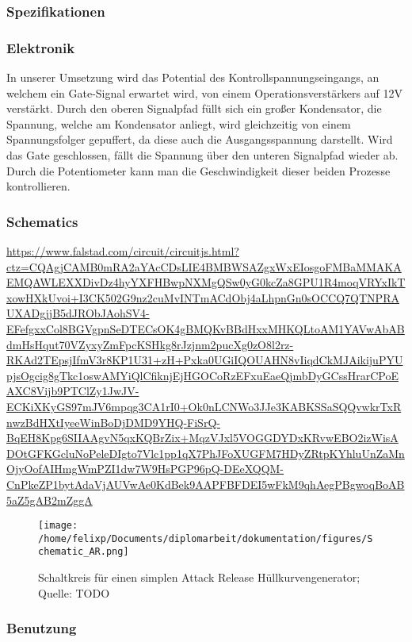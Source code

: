 \subsubsection{Spezifikationen}
\label{sec:orgc2427c2}
\subsubsection{Elektronik}
\label{sec:org35c4617}
In unserer Umsetzung wird das Potential des Kontrollspannungseingangs, an welchem ein Gate-Signal erwartet wird, von einem Operationsverstärkers auf 12V verstärkt. Durch den oberen Signalpfad füllt sich ein großer Kondensator, die Spannung, welche am Kondensator anliegt, wird gleichzeitig von einem Spannungsfolger gepuffert, da diese auch die Ausgangsspannung darstellt. Wird das Gate geschlossen, fällt die Spannung über den unteren Signalpfad wieder ab. Durch die Potentiometer kann man die Geschwindigkeit dieser beiden Prozesse kontrollieren.
\subsubsection{Schematics}
\label{sec:org4790a9a}
\url{https://www.falstad.com/circuit/circuitjs.html?ctz=CQAgjCAMB0mRA2aYAcCDsLIE4BMBWSAZgxWxEIosgoFMBaMMAKAEMQAWLEXXDivDz4hyYXFHBwpNXMgQSw0yG0kcZa8GPU1R4moqVRYxIkTxowHXkUvoi+I3CK502G9nz2cuMvINTmACdObj4aLhpnGn0sOCCQ7QTNPRAUXADgjjB5dJRObJAohSV4-EFefgxxCol8BGVgpnSeDTECsOK4gBMQKvBBdHxxMHKQLtoAM1YAVwAbABdmHsHqut70VZyxyZmFpcKSHkg8rJzjnm2pucXg0zO8l2rz-RKAd2TEpsjIfmV3r8KP1U31+zH+Pxka0UGiIQOUAHN8vIiqdCkMJAikijuPYUpjsOgcig8gTkc1oswAMYiQlCfiknjEjHGOCoRzEFxuEaeQjmbDyGCssHrarCPoEAXC8Vijb9PTClZy1JwJV-ECKiXKyGS97mJV6mpqg3CA1rI0+Ok0nLCNWo3JJe3KABKSSaSQQvwkrTxRnwzBdHXtIyeeWinBoDjDMD9YHQ-FiSrQ-BqEH8Kpg6SIIAAgvN5qxKQBrZix+MqzVJxl5VOGGDYDxKRvwEBO2izWisADOtGFKGcluNoPeleDIgto7Vlc1pp1qX7PhJFoXUGFM7HDyZRtpKYhluUnZaMnOjyOofAIHmgWmPZI1dw7W9HsPGP96pQ-DEeXQQM-CnPkeZP1bytAdaVjAUVwAe0KdBek9AAPFBFDEI5wFkM9qhAegPBgwoqBoAB5aZ5gAB2mZggA}
\begin{figure}[htbp]
\centering
\texttt{[image: /home/felixp/Documents/diplomarbeit/dokumentation/figures/Schematic\_AR.png]}
\caption{Schaltkreis für einen simplen Attack Release Hüllkurvengenerator; Quelle: TODO}
\end{figure}
\subsubsection{Benutzung}
\label{sec:org8de6520}
